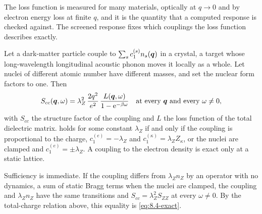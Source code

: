 The loss function is measured for many materials, optically at $q \to 0$ and by electron energy loss at finite $q$, and it is the quantity that a computed response is checked against. The screened response fixes which couplings the loss function describes exactly.
\begin{keyresult}
Let a dark-matter particle couple to $\sum_sc_1^{(s)}n_s(\bm{q})$ in a crystal, a target whose long-wavelength longitudinal acoustic phonon moves it locally as a whole. Let nuclei of different atomic number have different masses, and set the nuclear form factors to one. Then
\begin{equation}
  S_{cc}(\bm{q},\omega) = \lambda_Z^2\,\frac{2q^2}{e^2}\,\frac{L(\bm{q},\omega)}{1 - \mathrm{e}^{-\beta\omega}} \quad\text{at every } \bm{q} \text{ and every } \omega \neq 0 ,
  \label{eq:8.4-exact}
\end{equation}
with $S_{cc}$ the structure factor of the coupling and $L$ the loss function of the total dielectric matrix.  holds for some constant $\lambda_Z$ if and only if the coupling is proportional to the charge, $c_1^{(e)} = -\lambda_Z$ and $c_1^{(\kappa)} = \lambda_ZZ_\kappa$, or the nuclei are clamped and $c_1^{(e)} = \pm\lambda_Z$. A coupling to the electron density is exact only at a static lattice.
\end{keyresult}
\noindent Sufficiency is immediate. If the coupling differs from $\lambda_Zn_Z$ by an operator with no dynamics, a sum of static Bragg terms when the nuclei are clamped, the coupling and $\lambda_Zn_Z$ have the same transitions and $S_{cc} = \lambda_Z^2S_{ZZ}$ at every $\omega \neq 0$. By the total-charge relation above, this equality is \cref{eq:8.4-exact}.

